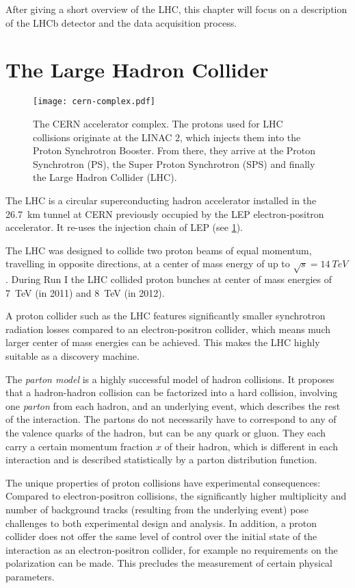 After giving a short overview of the \gls{LHC}, this chapter will focus on a description of the LHCb detector and the data acquisition process.

\section{The Large Hadron Collider}

\begin{figure}
  \centering
  \texttt{[image: cern-complex.pdf]}
  \caption{
    The CERN accelerator complex.
    The protons used for LHC collisions originate at the LINAC 2, which injects them into the Proton Synchrotron Booster.
    From there, they arrive at the Proton Synchrotron (PS), the Super Proton Synchrotron (SPS) and finally the Large Hadron Collider (LHC).
  }
  \label{fig:lhc}
\end{figure}

The LHC is a circular superconducting hadron accelerator installed in the \SI{26.7}{\kilo\metre} tunnel at CERN previously occupied by the LEP electron-positron accelerator.
It re-uses the injection chain of LEP (see \ref{fig:lhc}).

The LHC was designed to collide two proton beams of equal momentum, travelling in opposite directions, at a center of mass energy of up to $\sqrt{s} = \SI{14}{TeV}$.
During Run I the LHC collided proton bunches at center of mass energies of \SI{7}{TeV} (in 2011) and \SI{8}{TeV} (in 2012).

A proton collider such as the LHC features significantly smaller synchrotron radiation losses compared to an electron-positron collider, which means much larger center of mass energies can be achieved.
This makes the LHC highly suitable as a discovery machine.

The \emph{parton model} \cite{PartonModel} is a highly successful model of hadron collisions.
It proposes that a hadron-hadron collision can be factorized into a hard collision, involving one \emph{parton} from each hadron, and an underlying event, which describes the rest of the interaction.
The partons do not necessarily have to correspond to any of the valence quarks of the hadron, but can be any quark or gluon.
They each carry a certain momentum fraction $x$ of their hadron, which is different in each interaction and is described statistically by a parton distribution function.

The unique properties of proton collisions have experimental consequences:
Compared to electron-positron collisions, the significantly higher multiplicity  and number of background tracks (resulting from the underlying event) pose challenges to both experimental design and analysis.
In addition, a proton collider does not offer the same level of control over the initial state of the interaction as an electron-positron collider, for example no requirements on the polarization can be made.
This precludes the measurement of certain physical parameters.

